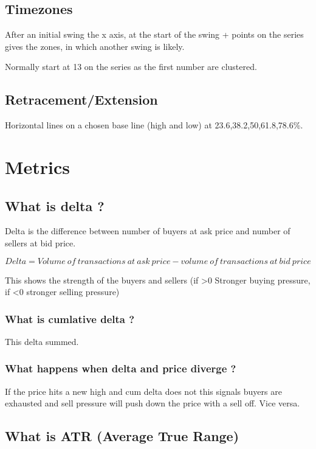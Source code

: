 \documentclass[11pt]{scrartcl} %
\begin{document}
\subsection{Timezones}

After an initial swing the x axis, at the start of the swing + points on the series gives the zones,
in which another swing is likely.

Normally start at 13 on the series as the first number are clustered.

\subsection{Retracement/Extension}

Horizontal lines on a chosen base line (high and low) at 23.6,38.2,50,61.8,78.6\%.

\section{Metrics}

\subsection{What is delta ?}

Delta is the difference between number of buyers at ask price and number of sellers at bid price.

\[ Delta = Volume\:of\:transactions\:at\:ask\:price - volume\:of\:transactions\:at\:bid\:price \]

This shows the strength of the buyers and sellers (if >0 Stronger buying pressure, if <0 stronger 
selling pressure)

\subsubsection{What is cumlative delta ?}

This delta summed.

\subsubsection{What happens when delta and price diverge ?}

If the price hits a new high and cum delta does not this signals buyers are exhausted and sell pressure will
push down the price with a sell off. Vice versa.

\subsection{What is ATR (Average True Range)}
\end{document}
